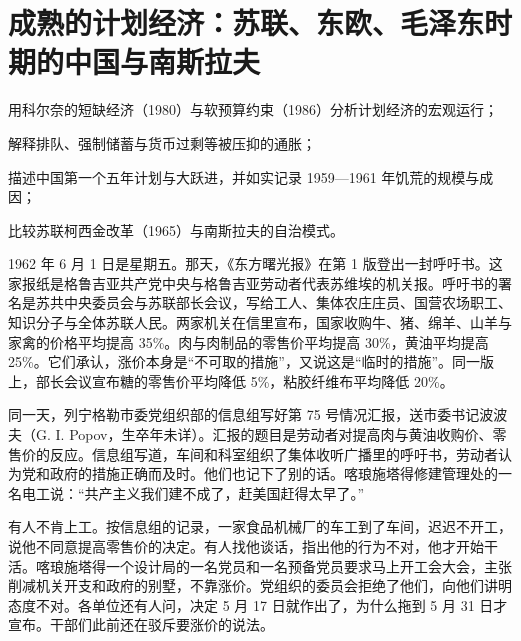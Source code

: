\chapter{成熟的计划经济：苏联、东欧、毛泽东时期的中国与南斯拉夫}\label{ch:planned}

\begin{chapterguide}
\begin{guidegoals}
\item 用科尔奈的短缺经济（1980）与软预算约束（1986）分析计划经济的宏观运行；
\item 解释排队、强制储蓄与货币过剩等被压抑的通胀；
\item 描述中国第一个五年计划与大跃进，并如实记录 1959—1961 年饥荒的规模与成因；
\item 比较苏联柯西金改革（1965）与南斯拉夫的自治模式。
\end{guidegoals}
\end{chapterguide}

1962 年 6 月 1 日是星期五。那天，《东方曙光报》在第 1 版登出一封呼吁书\cite{zv1962}。这家报纸是格鲁吉亚共产党中央与格鲁吉亚劳动者代表苏维埃的机关报\cite{zv1962}。呼吁书的署名是苏共中央委员会与苏联部长会议，写给工人、集体农庄庄员、国营农场职工、知识分子与全体苏联人民\cite{zv1962}。两家机关在信里宣布，国家收购牛、猪、绵羊、山羊与家禽的价格平均提高 35\%\cite{zv1962}。肉与肉制品的零售价平均提高 30\%，黄油平均提高 25\%\cite{zv1962}。它们承认，涨价本身是“不可取的措施”，又说这是“临时的措施”\cite{zv1962}。同一版上，部长会议宣布糖的零售价平均降低 5\%，粘胶纤维布平均降低 20\%\cite{zv1962}。

同一天，列宁格勒市委党组织部的信息组写好第 75 号情况汇报，送市委书记波波夫（G. I. Popov，生卒年未详）\cite{lenkom1962}。汇报的题目是劳动者对提高肉与黄油收购价、零售价的反应\cite{lenkom1962}。信息组写道，车间和科室组织了集体收听广播里的呼吁书，劳动者认为党和政府的措施正确而及时\cite{lenkom1962}。他们也记下了别的话。喀琅施塔得修建管理处的一名电工说：“共产主义我们建不成了，赶美国赶得太早了。”\cite{lenkom1962}

有人不肯上工。按信息组的记录，一家食品机械厂的车工到了车间，迟迟不开工，说他不同意提高零售价的决定\cite{lenkom1962}。有人找他谈话，指出他的行为不对，他才开始干活\cite{lenkom1962}。喀琅施塔得一个设计局的一名党员和一名预备党员要求马上开工会大会，主张削减机关开支和政府的别墅，不靠涨价\cite{lenkom1962}。党组织的委员会拒绝了他们，向他们讲明态度不对\cite{lenkom1962}。各单位还有人问，决定 5 月 17 日就作出了，为什么拖到 5 月 31 日才宣布\cite{lenkom1962}。干部们此前还在驳斥要涨价的说法\cite{lenkom1962}。

